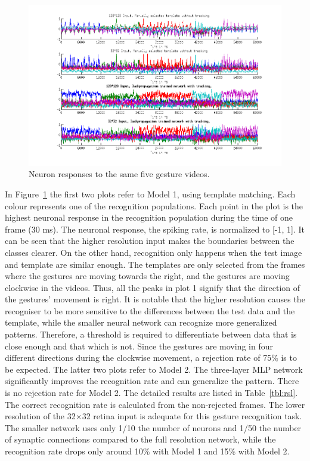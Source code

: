 \begin{figure}
\centering
	\includegraphics[width=1\textwidth]{pics/4.png}
	\caption{Neuron responses to the same five gesture videos.}
	\label{fig:matlabrec}
\end{figure}




In Figure~\ref{fig:matlabrec} the first two plots refer to Model 1, using template matching. Each colour represents one of the recognition populations. 
Each point in the plot is the highest neuronal response in the recognition population during the time of one frame (30 ms). 
The neuronal response, the spiking rate, is normalized to [-1, 1]. 
It can be seen that the higher resolution input makes the boundaries between the classes clearer. 
On the other hand, recognition only happens when the test image and template are similar enough. 
The templates are only selected from the frames where the gestures are moving towards the right, and the gestures are moving clockwise in the videos. 
Thus, all the peaks in plot 1 signify that the direction of the gestures’ movement is right.  
It is notable that the higher resolution causes the recogniser to be more sensitive to the differences between the test data and the template, while the smaller neural network can recognize more generalized patterns. 
Therefore, a threshold is required to differentiate between data that is close enough and that which is not. 
Since the gestures are moving in four different directions during the clockwise movement, a rejection rate of 75\% is to be expected. 
The latter two plots refer to Model 2. 
The three-layer MLP network significantly improves the recognition rate and can generalize the pattern. 
There is no rejection rate for Model 2. 
The detailed results are listed in  Table~\ref{tbl:rsl}. 
The correct recognition rate is calculated from the non-rejected frames.
The lower resolution of the 32$\times$32 retina input is adequate for this gesture recognition task. 
The smaller network uses only 1/10 the number of neurons and 1/50 the number of synaptic connections compared to the full resolution network, while the recognition rate drops only around 10\% with Model 1 and 15\% with Model 2.

